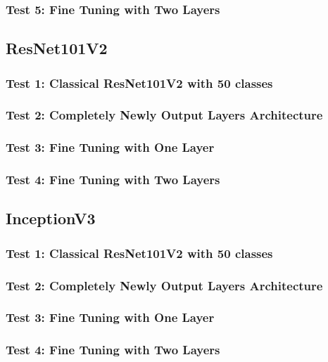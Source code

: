 \subsubsection{Test 5: Fine Tuning with Two Layers}







\subsection{ResNet101V2}

\subsubsection{Test 1: Classical ResNet101V2 with 50 classes}

\subsubsection{Test 2: Completely Newly Output Layers Architecture}

\subsubsection{Test 3: Fine Tuning with One Layer}

\subsubsection{Test 4: Fine Tuning with Two Layers}







\subsection{InceptionV3}

\subsubsection{Test 1: Classical ResNet101V2 with 50 classes}

\subsubsection{Test 2: Completely Newly Output Layers Architecture}

\subsubsection{Test 3: Fine Tuning with One Layer}

\subsubsection{Test 4: Fine Tuning with Two Layers}
